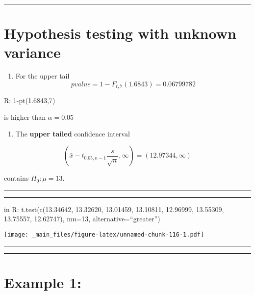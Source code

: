 \documentclass[
]{book}
\providecommand{\tightlist}{%
  \setlength{\itemsep}{0pt}\setlength{\parskip}{0pt}}
\begin{document}
\begin{center}\rule{0.5\linewidth}{0.5pt}\end{center}

\hypertarget{hypothesis-testing-with-unknown-variance-2}{%
\section{Hypothesis testing with unknown variance}\label{hypothesis-testing-with-unknown-variance-2}}

\begin{enumerate}
\def\labelenumi{\arabic{enumi}.}
\setcounter{enumi}{1}
\tightlist
\item
  For the upper tail \[pvalue=1-F_{t,7}(1.6843)=0.06799782\]
\end{enumerate}

R: 1-pt(1.6843,7)

is higher than \(\alpha=0.05\)

\begin{enumerate}
\def\labelenumi{\arabic{enumi}.}
\setcounter{enumi}{2}
\tightlist
\item
  The \textbf{upper tailed} confidence interval
\end{enumerate}

\[(\bar{x}-t_{0.05, n-1} \frac{s}{\sqrt{n}}, \infty)=(12.97344, \infty)\]

contains \(H_0:\mu=13\).

\begin{center}\rule{0.5\linewidth}{0.5pt}\end{center}

\begin{center}\rule{0.5\linewidth}{0.5pt}\end{center}

in R:
t.test(c(13.34642, 13.32620, 13.01459, 13.10811,
12.96999, 13.55309, 13.75557, 12.62747), mu=13, alternative=``greater'')

\texttt{[image: \_main\_files/figure-latex/unnamed-chunk-116-1.pdf]}

\begin{center}\rule{0.5\linewidth}{0.5pt}\end{center}

\begin{center}\rule{0.5\linewidth}{0.5pt}\end{center}

\hypertarget{example-1-4}{%
\section{Example 1:}\label{example-1-4}}
\end{document}

